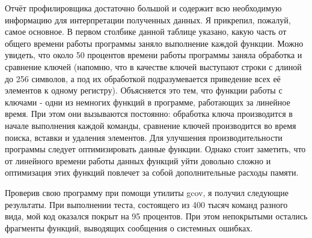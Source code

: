 Отчёт профилировщика достаточно большой и содержит всю необходимую информацию для интерпретации полученных данных. 
Я прикрепил, пожалуй, самое основное. В первом столбике данной таблице указано, какую часть от общего времени работы 
программы заняло выполнение каждой функции. Можно увидеть, что около 50 процентов времени работы программы заняла обработка 
и сравнение ключей (напомню, что в качестве ключей выступают строки с длиной до 256 символов, а под их обработкой 
подразумевается приведение всех её элементов к одному регистру). Объясняется это тем, что функции работы с ключами 
- одни из немногих функций в программе, работающих за линейное время. При этом они вызываются постоянно: обработка 
ключа производится в начале выполнения каждой команды, сравнение ключей производится во время поиска, вставки и 
удаления элементов. Для улучшения производительности программы следует оптимизировать данные функции. Однако стоит 
заметить, что от линейного времени работы данных функций уйти довольно сложно и оптимизация этих функций повлечет за 
собой дополнительные расходы памяти. 

Проверив свою программу при помощи утилиты gcov, я получил следующие результаты. При выполнении теста, состоящего из 
400 тысяч команд разного вида, мой код оказался покрыт на 95 процентов. При этом непокрытыми остались фрагменты функций, 
выводящих сообщения о системных ошибках.



\pagebreak

